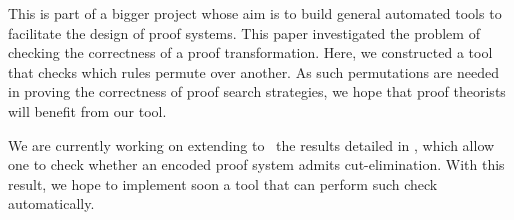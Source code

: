 This is part of a bigger project whose aim is to build general
automated tools to
facilitate the design of proof systems. This paper
investigated the problem of checking the correctness of a proof
transformation. Here, we constructed a tool that checks which
rules permute over another. As such permutations are needed in proving the
correctness of proof search strategies, we hope that proof theorists will
benefit from our tool. 

We are currently working on extending to \sellf\ the results detailed in
\cite{miller.ep}, which allow one to check whether an encoded
proof system admits cut-elimination. With this result, we hope to
implement soon a tool that can perform such check automatically.


